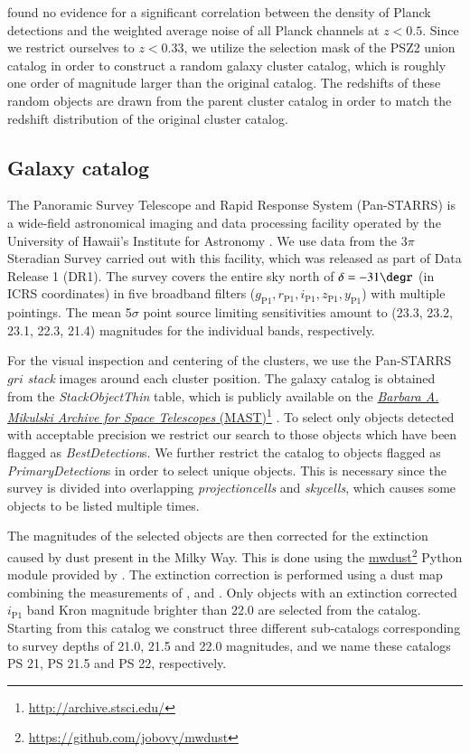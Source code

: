 \documentclass[iop, apjl, twocolappendix, numberedappendix]{emulateapj}
\newcommand\fnurl[2]{%
  \href{#2}{#1}\footnote{\url{#2}}%
}
\begin{document}
\citet{kosyra2015environment} found no evidence for a significant
correlation between the density of Planck detections and the
weighted average noise of all Planck channels at $z<0.5$. Since we
restrict ourselves to $z<0.33$, we utilize the selection mask of the
PSZ2 union catalog in order to construct a random galaxy cluster
catalog, which is roughly one order of magnitude larger than the
original catalog. The redshifts of these random objects are drawn
from the parent cluster catalog in order to match the redshift
distribution of the original cluster catalog. 

\subsection{Galaxy catalog}
\label{sec:galaxies}
The Panoramic Survey Telescope and Rapid Response System
(Pan-STARRS) is a wide-field astronomical imaging and data
processing facility operated by the University of Hawaii's Institute
for Astronomy \citep{kaiser2002pan,kaiser2010pan}. We use data from
the 3$\pi$ Steradian Survey carried out with this facility, which
was released as part of Data Release 1 (DR1). The survey covers the
entire sky north of $\delta=-31\degr$ (in ICRS coordinates) in five
broadband filters ($g_{\mathrm{P1}}, r_{\mathrm{P1}},
i_{\mathrm{P1}}, z_{\mathrm{P1}}, y_{\mathrm{P1}}$) with multiple
pointings. The mean 5$\sigma$ point source limiting sensitivities
amount to (23.3, 23.2, 23.1, 22.3, 21.4) magnitudes for the
individual bands, respectively. 

For the visual inspection and centering of the clusters, we use the
Pan-STARRS $gri$ \textit{stack} images around each cluster position.
The galaxy catalog is obtained from the  \textit{StackObjectThin}
table, which is publicly available on the \fnurl{\textit{Barbara A.
Mikulski Archive for Space Telescopes}
(MAST)}{http://archive.stsci.edu/}. To select only objects detected
with acceptable precision we restrict our search to those objects
which have been flagged as \textit{BestDetection}s. We further
restrict the catalog to objects flagged as
\textit{PrimaryDetection}s in order to select unique objects. This
is necessary since the survey is divided into overlapping
\textit{projectioncells} and \textit{skycells}, which causes some objects
to be listed multiple times.

The magnitudes of the selected objects are then corrected for the
extinction caused by dust present in the Milky Way. This is done
using the \fnurl{mwdust}{https://github.com/jobovy/mwdust} Python
module provided by \citet{bovy2016galactic}. The extinction
correction is performed using a dust map combining the measurements
of \citet{marshall2006modelling}, \citet{green2015three} and
\citet{drimmel2003three}. Only objects with an extinction corrected
$i_{\mathrm{P1}}$ band Kron magnitude brighter than 22.0 are
selected from the catalog. Starting from this catalog we construct
three different sub-catalogs corresponding to survey depths of 21.0,
21.5 and 22.0 magnitudes, and we name these catalogs PS 21, PS 21.5
and PS 22, respectively.
\end{document}
